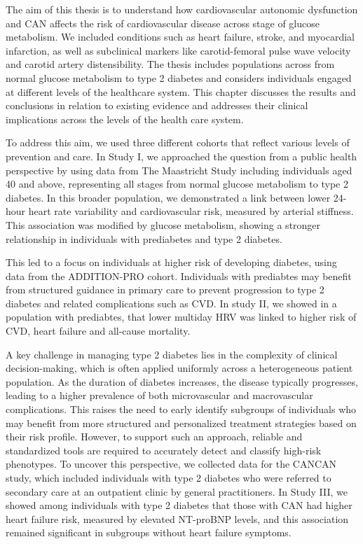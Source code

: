 \documentclass[
  a4paper,
  headsepline=true,
  open=any]{scrbook}
\begin{document}
The aim of this thesis is to understand how cardiovascular autonomic
dysfunction and CAN affects the risk of cardiovascular disease across
stage of glucose metabolism. We included conditions such as heart
failure, stroke, and myocardial infarction, as well as subclinical
markers like carotid-femoral pulse wave velocity and carotid artery
distensibility. The thesis includes populations across from normal
glucose metabolism to type 2 diabetes and considers individuals engaged
at different levels of the healthcare system. This chapter discusses the
results and conclusions in relation to existing evidence and addresses
their clinical implications across the levels of the health care system.

To address this aim, we used three different cohorts that reflect
various levels of prevention and care. In Study I, we approached the
question from a public health perspective by using data from The
Maastricht Study including individuals aged 40 and above, representing
all stages from normal glucose metabolism to type 2 diabetes. In this
broader population, we demonstrated a link between lower 24-hour heart
rate variability and cardiovascular risk, measured by arterial
stiffness. This association was modified by glucose metabolism, showing
a stronger relationship in individuals with prediabetes and type 2
diabetes.

This led to a focus on individuals at higher risk of developing
diabetes, using data from the ADDITION-PRO cohort. Individuals with
prediabtes may benefit from structured guidance in primary care to
prevent progression to type 2 diabetes and related complications such as
CVD. In study II, we showed in a population with prediabtes, that lower
multiday HRV was linked to higher risk of CVD, heart failure and
all-cause mortality.

A key challenge in managing type 2 diabetes lies in the complexity of
clinical decision-making, which is often applied uniformly across a
heterogeneous patient population. As the duration of diabetes increases,
the disease typically progresses, leading to a higher prevalence of both
microvascular and macrovascular complications. This raises the need to
early identify subgroups of individuals who may benefit from more
structured and personalized treatment strategies based on their risk
profile. However, to support such an approach, reliable and standardized
tools are required to accurately detect and classify high-risk
phenotypes. To uncover this perspective, we collected data for the
CANCAN study, which included individuals with type 2 diabetes who were
referred to secondary care at an outpatient clinic by general
practitioners. In Study III, we showed among individuals with type 2
diabetes that those with CAN had higher heart failure risk, measured by
elevated NT-proBNP levels, and this association remained significant in
subgroups without heart failure symptoms.
\end{document}
